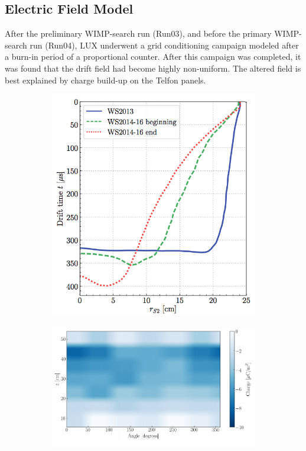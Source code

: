 \subsection{Electric Field Model}\label{sec:efield}
After the preliminary WIMP-search run (Run03), and before the primary WIMP-search run (Run04), LUX underwent a grid conditioning campaign modeled after a burn-in period of a proportional counter. After this campaign was completed, it was found that the drift field had become highly non-uniform. The altered field is best explained by charge build-up on the Telfon panels.
\begin{figure}[!h]
\centering
\begin{subfigure}{0.5\linewidth}
\centering
\includegraphics[width=\linewidth]{Figures/wall_radius.png}
\caption{}
\end{subfigure}%
\begin{subfigure}{0.5\linewidth}
\centering
\includegraphics[width=\linewidth]{Figures/wall_charge.png}

\end{subfigure}
\end{figure}
